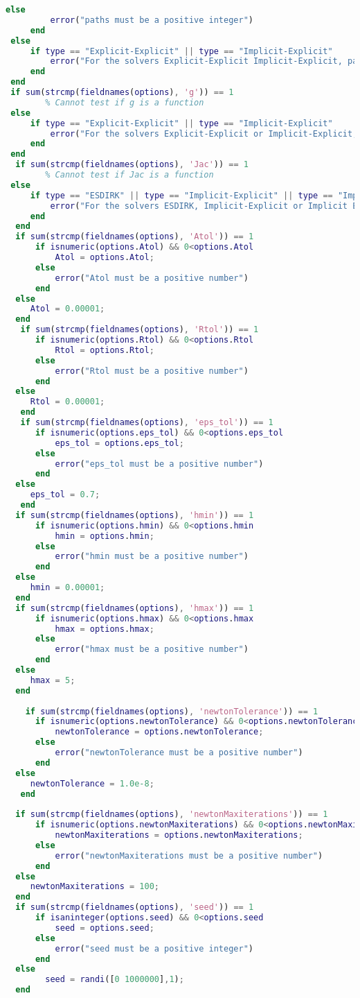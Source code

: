 \begin{lstlisting}[language=Matlab,caption=ODEsolver wrapper,label=lst0:wrapper]
     else
         error("paths must be a positive integer")
     end
 else
     if type == "Explicit-Explicit" || type == "Implicit-Explicit"
         error("For the solvers Explicit-Explicit Implicit-Explicit, paths must be defined")   
     end
 end
 if sum(strcmp(fieldnames(options), 'g')) == 1
        % Cannot test if g is a function
 else
     if type == "Explicit-Explicit" || type == "Implicit-Explicit"
         error("For the solvers Explicit-Explicit or Implicit-Explicit, g must be defined")   
     end
 end
  if sum(strcmp(fieldnames(options), 'Jac')) == 1
        % Cannot test if Jac is a function
 else
     if type == "ESDIRK" || type == "Implicit-Explicit" || type == "Implicit Euler"
         error("For the solvers ESDIRK, Implicit-Explicit or Implicit Euler, Jac must be defined")   
     end
  end
  if sum(strcmp(fieldnames(options), 'Atol')) == 1
      if isnumeric(options.Atol) && 0<options.Atol
          Atol = options.Atol;
      else
          error("Atol must be a positive number")
      end
  else
     Atol = 0.00001;
  end
   if sum(strcmp(fieldnames(options), 'Rtol')) == 1
      if isnumeric(options.Rtol) && 0<options.Rtol
          Rtol = options.Rtol;
      else
          error("Rtol must be a positive number")
      end
  else
     Rtol = 0.00001;
   end
   if sum(strcmp(fieldnames(options), 'eps_tol')) == 1
      if isnumeric(options.eps_tol) && 0<options.eps_tol
          eps_tol = options.eps_tol;
      else
          error("eps_tol must be a positive number")
      end
  else
     eps_tol = 0.7;
   end
  if sum(strcmp(fieldnames(options), 'hmin')) == 1
      if isnumeric(options.hmin) && 0<options.hmin
          hmin = options.hmin;
      else
          error("hmin must be a positive number")
      end
  else
     hmin = 0.00001;
  end
  if sum(strcmp(fieldnames(options), 'hmax')) == 1
      if isnumeric(options.hmax) && 0<options.hmax
          hmax = options.hmax;
      else
          error("hmax must be a positive number")
      end
  else
     hmax = 5;
  end
  
    if sum(strcmp(fieldnames(options), 'newtonTolerance')) == 1
      if isnumeric(options.newtonTolerance) && 0<options.newtonTolerance
          newtonTolerance = options.newtonTolerance;
      else
          error("newtonTolerance must be a positive number")
      end
  else
     newtonTolerance = 1.0e-8;
   end
  
  if sum(strcmp(fieldnames(options), 'newtonMaxiterations')) == 1
      if isnumeric(options.newtonMaxiterations) && 0<options.newtonMaxiterations
          newtonMaxiterations = options.newtonMaxiterations;
      else
          error("newtonMaxiterations must be a positive number")
      end
  else
     newtonMaxiterations = 100;
  end
  if sum(strcmp(fieldnames(options), 'seed')) == 1
      if isaninteger(options.seed) && 0<options.seed
          seed = options.seed;
      else
          error("seed must be a positive integer")
      end
  else
        seed = randi([0 1000000],1);
  end
  

\end{lstlisting}
